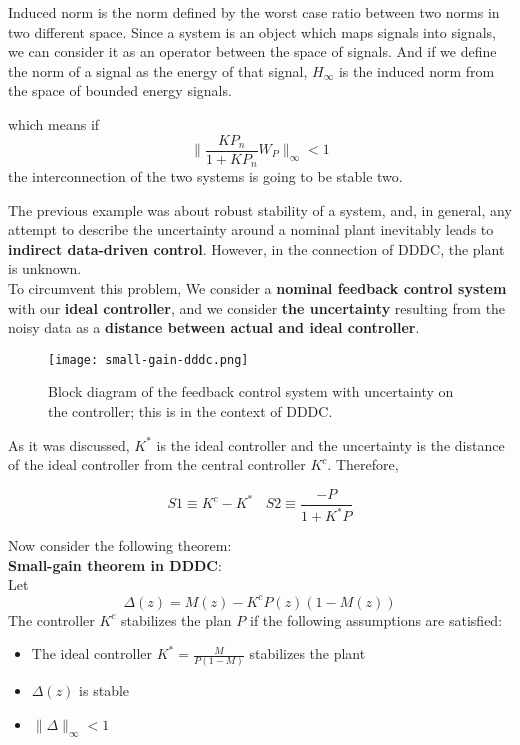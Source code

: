 \begin{example}
  \begin{factbox}
 Induced norm is the norm defined by the worst case ratio between two norms in two different space. Since a system is an object which maps signals into signals, we can consider it as an operator between the space of signals. And if we define the norm of a signal as the energy of that signal, $H_\infty$ is the induced norm from the space of bounded energy signals.
 \end{factbox}

which means if 
\[
 \|\frac{KP_n}{1 + KP_n}W_P\|_\infty < 1
\]
the interconnection of the two systems is going to be stable two.
\end{example}


The previous example was about robust stability of a system, and, in general, any attempt to describe the uncertainty around a nominal plant inevitably leads to \textbf{indirect data-driven control}. However, in the connection of DDDC, the plant is unknown.\\

To circumvent this problem, We consider a \textbf{nominal feedback control system} with our \textbf{ideal controller}, and we consider \textbf{the uncertainty} resulting from the noisy data as a \textbf{distance between actual and ideal controller}.\\

 \begin{figure}[H]
    \centering
    \texttt{[image: small-gain-dddc.png]}
    \caption{Block diagram of the feedback control system with uncertainty on the controller; this is in the context of DDDC.}
 \end{figure}

As it was discussed, $K^{*}$ is the ideal controller and the uncertainty is the distance of the ideal controller from the central controller $K^{c}$. Therefore,

\[
S1 \equiv K^{c} - K^{*} \:\:\:\: S2 \equiv \frac{-P}{1+K^{*}P} 
\]

Now consider the following theorem:\\
\newpage
\textbf{Small-gain theorem in DDDC}:\\
Let
\[
\Delta(z) = M(z) - K^{c}P(z)(1-M(z))
\]
The controller $K^{c}$ stabilizes the plan $P$ if the following assumptions are satisfied:
\begin{itemize}
    \item The ideal controller $K^{*} = \frac{M}{P(1-M)}$ stabilizes the plant
    \item $\Delta(z)$ is stable
    \item $\|\Delta\|_\infty<1 $
\end{itemize}

